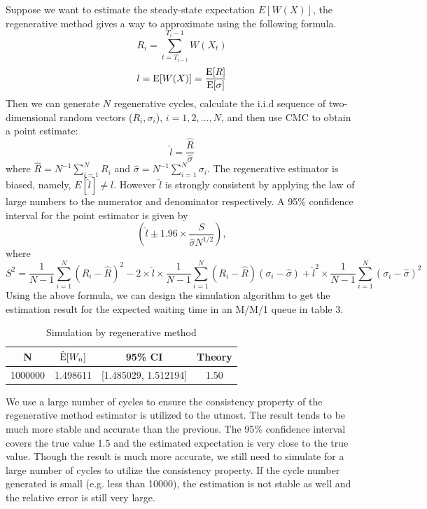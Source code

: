 \documentclass{article}
\begin{document}
Suppose we want to estimate the steady-state expectation $E[W(X)]$, the regenerative method gives a way to approximate using the following formula.
\begin{equation}
	R_i = \sum_{t=T_{i-1}}^{T_i-1}W(X_t)
\end{equation}
\begin{equation}
	l = {\rm E}[W(X)] = \frac{{\rm E}[R]}{{\rm E}[\sigma]}
\end{equation}
Then we can generate $N$ regenerative cycles, calculate the i.i.d sequence of two-dimensional random vectors ($R_i,\sigma_i$), $i=1,2,\dots,N$, and then use CMC to obtain a point estimate:
\begin{equation}
	\hat{l} = \frac{\hat{R}}{\hat{\sigma}}
\end{equation}
where $\hat{R}=N^{-1}\sum_{i=1}^N R_i$ and $\hat{\sigma}=N^{-1}\sum_{i=1}^N \sigma_i$. The regenerative estimator is biased, namely, $E[\hat{l}] \neq l$. However $\hat{l}$ is strongly consistent by applying the law of large numbers to the numerator and denominator respectively. 
A 95\% confidence interval for the point estimator is given by 
\begin{equation}
	(\hat{l} \pm 1.96\times \frac{S}{\hat{\sigma}N^{1/2}}),
\end{equation}
where
\begin{equation}
	S^2 = \frac{1}{N-1}\sum_{i=1}^N (R_i-\hat{R})^2 - 2\times \hat{l} \times  \frac{1}{N-1}\sum_{i=1}^N (R_i-\hat{R})(\sigma_i-\hat{\sigma}) + \hat{l}^2\times \frac{1}{N-1}\sum_{i=1}^N (\sigma_i-\hat{\sigma})^2
\end{equation}
Using the above formula, we can design the simulation algorithm to get the estimation result for the expected waiting time in an M/M/1 queue in table 3.

\begin{table}[!htbp]
    \small
	\centering
	\begin{tabularx}{0.47\textwidth}{cccc}
		\toprule
        N
		& $\hat{{\rm E}}[W_n]$ 
        & 95\% CI
		& Theory\\

        \midrule
        1000000
        & 1.498611
        & [1.485029, 1.512194]
		& 1.50

        \\
		\bottomrule
	\end{tabularx}%
	\label{tab:addlabel}%
	\caption{Simulation by regenerative method}
\end{table}%
We use a large number of cycles to ensure the consistency property of the regenerative method estimator is utilized to the utmost. The result tends to be much more stable and accurate than the previous. The 95\% confidence interval covers the true value 1.5 and the estimated expectation is very close to the true value. 
Though the result is much more accurate, we still need to simulate for a large number of cycles to utilize the consistency property. If the cycle number generated is small (e.g. less than 10000), the estimation is not stable as well and the relative error is still very large.
\end{document}

